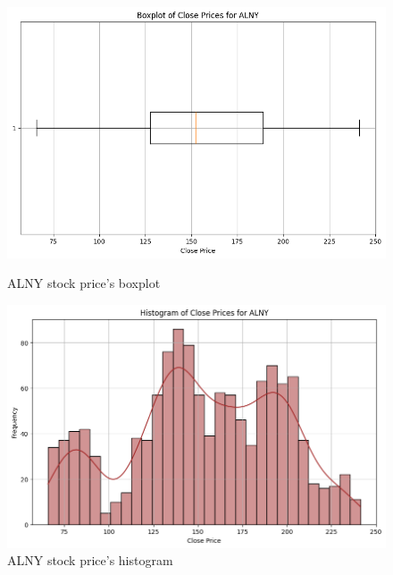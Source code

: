 \documentclass{ieeeojies}
\begin{document}
\begin{figure}[H]
    \centering
    \begin{minipage}{0.23\textwidth}
    \centering
    \includegraphics[width=1\textwidth]{bibliography/Figure/ALNYboxplot.png}
    \caption{ALNY stock price's boxplot}
    \label{fig:1}
    \end{minipage}
    \hfill
    \begin{minipage}{0.23\textwidth}
    \centering
    \includegraphics[width=1\textwidth]{bibliography/Figure/ALNYhist.png}
    \caption{ALNY stock price's histogram}
    \label{fig:2}
    \end{minipage}
\end{figure}
\end{document}
